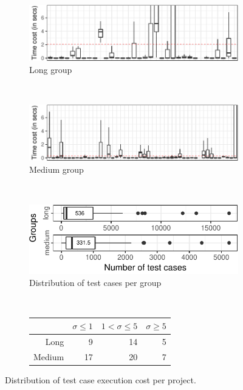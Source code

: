 \begin{figure}[ht]
    \centering

    \begin{subfigure}{0.47\textwidth}
      \centering
      \includegraphics[width=\textwidth]{plots/testcost-long.pdf}
      \caption{\label{fig:longtcost}Long group}
    \end{subfigure}\\
    \vspace{2.5ex}
    \begin{subfigure}{0.47\textwidth}
      \centering
      \includegraphics[width=\textwidth]{plots/testcost-medium.pdf}
      \caption{\label{fig:medtcost}Medium group}
    \end{subfigure}\\
    \vspace{2.5ex}
    \begin{subfigure}{0.47\textwidth}
      \centering
      \includegraphics[width=\textwidth]{plots/boxplots-testcases.pdf}
      \caption{\label{fig:medtcost}Distribution of test cases per group}
    \end{subfigure}\\
    \vspace{2.5ex}
    \begin{subfigure}{0.5\textwidth}
      \centering
      \begin{tabular}{rrrr}
        \toprule
        & $\sigma\leq1$ & $1<\sigma\leq5$ & $\sigma\ge5$ \\
        \midrule    
        Long   &  9 & 14 & 5 \\
        Medium & 17 & 20 & 7 \\
        \bottomrule
      \end{tabular}
      \caption{\label{fig:sd}}    
    \end{subfigure}%

    \caption{\label{fig:time-distributions}Distribution of test case
    execution cost per project.}    
\end{figure}

